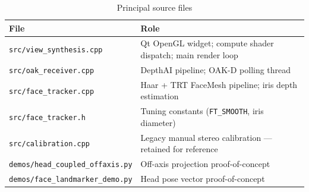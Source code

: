 \documentclass[11pt, a4paper]{report}
\begin{document}
\begin{table}[h]
\centering
\caption{Principal source files}
\begin{tabular}{@{}p{5.5cm}p{7cm}@{}}
\toprule
File & Role \\
\midrule
\texttt{src/view\_synthesis.cpp}
  & Qt OpenGL widget; compute shader dispatch; main render loop \\
\texttt{src/oak\_receiver.cpp}
  & DepthAI pipeline; OAK-D polling thread \\
\texttt{src/face\_tracker.cpp}
  & Haar + TRT FaceMesh pipeline; iris depth estimation \\
\texttt{src/face\_tracker.h}
  & Tuning constants (\texttt{FT\_SMOOTH}, iris diameter) \\
\texttt{src/calibration.cpp}
  & Legacy manual stereo calibration --- retained for reference \\
\texttt{demos/head\_coupled\_offaxis.py}
  & Off-axis projection proof-of-concept \\
\texttt{demos/face\_landmarker\_demo.py}
  & Head pose vector proof-of-concept \\
\bottomrule
\end{tabular}
\end{table}
\end{document}
